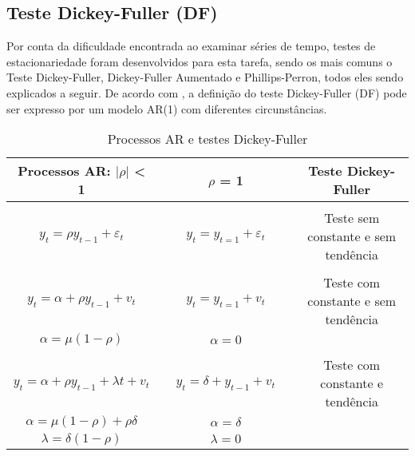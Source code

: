 
\subsection{Teste Dickey-Fuller (DF)}

Por conta da dificuldade encontrada ao examinar séries de tempo, testes de estacionariedade foram desenvolvidos para esta tarefa, sendo os mais comuns o Teste Dickey-Fuller, Dickey-Fuller Aumentado e Phillips-Perron, todos eles sendo explicados a seguir. De acordo com , a definição do teste Dickey-Fuller (DF) pode ser expresso por um modelo AR(1) com diferentes circunstâncias.



\begin{table}[!h]
    \centering
    \caption{Processos AR e testes Dickey-Fuller}
    \begin{tabular}{ccccc}
    \hline
Processos AR: $|\rho|$ < 1 && $\rho$ = 1 && Teste Dickey-Fuller \\
    \hline \\ \hline
$y_t = \rho y_{t-1} + \varepsilon_t$ && $y_t = y_{t=1} + \varepsilon_t$ && Teste sem constante e sem tendência \\
    \hline \\ \hline
$y_t = \alpha + \rho y_{t-1} + v_t$ && $y_t = y_{t=1} + v_t$ && Teste com constante e sem tendência \\
$\alpha = \mu(1-\rho)$ && $\alpha=0$ &&      \\
    \hline \\ \hline
$y_t = \alpha + \rho y_{t-1} + \lambda t + v_t$ && $y_t = \delta + y_{t-1} + v_t$ && Teste com constante e tendência \\
$\alpha = \mu(1-\rho) + \rho \delta$ && $\alpha = \delta$ &&     \\
$\lambda = \delta(1-\rho)$ && $\lambda = 0$      \\
    \hline
    \end{tabular} \label{DFtests}
\end{table}

